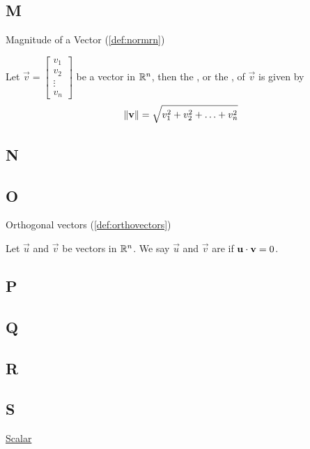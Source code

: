 \documentclass{ximera}
\begin{document}
\subsection{M}
Magnitude of a Vector (\ref{def:normrn})
\begin{expandable}
Let $\vec{v}=\begin{bmatrix}v_1\\ v_2\\ \vdots \\v_n\end{bmatrix}$ be a vector in $\mathbb{R}^n$, then the , or the , of $\vec{v}$ is given by
$$  \left\lVert\mathbf{v}\right\rVert=\sqrt{v_1^2+v_2^2+\ldots +v_n^2}$$
\end{expandable}
    


\subsection{N}

\subsection{O}
Orthogonal vectors (\ref{def:orthovectors}) 
\begin{expandable}
Let $\vec{u}$ and $\vec{v}$ be vectors in $\mathbb{R}^n$. We say $\vec{u}$ and $\vec{v}$ are  if $\mathbf{u}\cdot \mathbf{v}=0$.
\end{expandable}

\subsection{P}

\subsection{Q}

\subsection{R}

\subsection{S}
\href{https://ximera.osu.edu/oerlinalg/LinearAlgebra/VEC-0010/main}{Scalar} 
\end{document}
